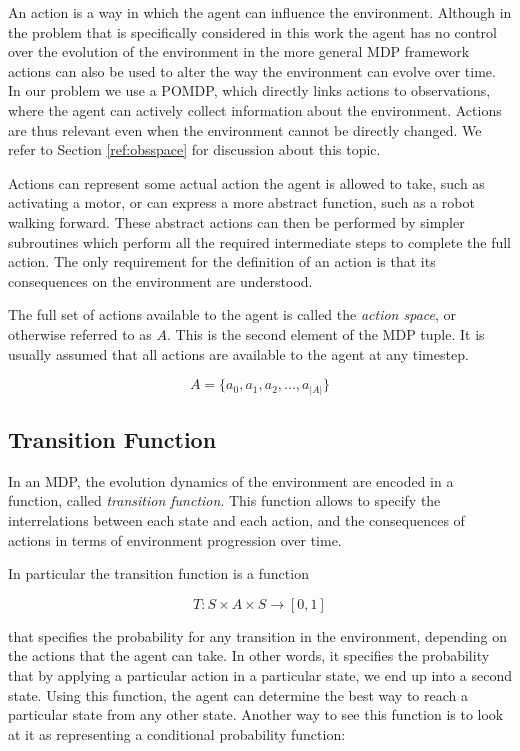 An action is a way in which the agent can influence the environment. Although in the problem that is
specifically considered in this work the agent has no control over the evolution of the environment
in the more general MDP framework actions can also be used to alter the way the environment can
evolve over time. In our problem we use a POMDP, which directly links actions to observations, where
the agent can actively collect information about the environment. Actions are thus relevant even
when the environment cannot be directly changed. We refer to Section \ref{ref:obsspace} for discussion
about this topic.

Actions can represent some actual action the agent is allowed to take, such as activating a motor,
or can express a more abstract function, such as a robot walking forward. These abstract actions can
then be performed by simpler subroutines which perform all the required intermediate steps to
complete the full action. The only requirement for the definition of an action is that its
consequences on the environment are understood.

The full set of actions available to the agent is called the \textit{action space}, or otherwise
referred to as $A$. This is the second element of the MDP tuple. It is usually assumed that all
actions are available to the agent at any timestep.

\[ A = \{ a_0, a_1, a_2, ..., a_{|A|} \} \]

\subsection{Transition Function}

In an MDP, the evolution dynamics of the environment are encoded in a function, called
\textit{transition function}. This function allows to specify the interrelations between each state
and each action, and the consequences of actions in terms of environment progression over time.

In particular the transition function is a function

\[ T: S\times A \times S \rightarrow [0,1] \]

that specifies the probability for any transition in the environment, depending on the actions that
the agent can take. In other words, it specifies the probability that by applying a particular
action in a particular state, we end up into a second state. Using this function, the agent can
determine the best way to reach a particular state from any other state. Another way to see this
function is to look at it as representing a conditional probability function:

